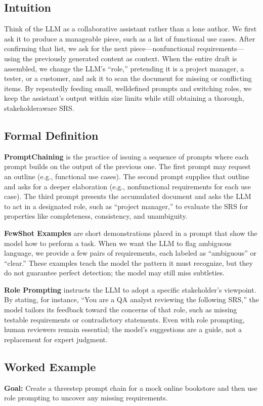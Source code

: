 \documentclass[12pt, a4paper]{article}
\begin{document}
\subsection{Intuition}
Think of the LLM as a collaborative assistant rather than a lone author.  
We first ask it to produce a manageable piece, such as a list of functional use cases.  
After confirming that list, we ask for the next piece---nonfunctional requirements---using the previously generated content as context.  
When the entire draft is assembled, we change the LLM's ``role,'' pretending it is a project manager, a tester, or a customer, and ask it to scan the document for missing or conflicting items.  
By repeatedly feeding small, welldefined prompts and switching roles, we keep the assistant's output within size limits while still obtaining a thorough, stakeholderaware SRS.

\subsection{Formal Definition}
\textbf{PromptChaining} is the practice of issuing a sequence of prompts where each prompt builds on the output of the previous one.  
The first prompt may request an outline (e.g., functional use cases).  
The second prompt supplies that outline and asks for a deeper elaboration (e.g., nonfunctional requirements for each use case).  
The third prompt presents the accumulated document and asks the LLM to act in a designated role, such as ``project manager,'' to evaluate the SRS for properties like completeness, consistency, and unambiguity.

\textbf{FewShot Examples} are short demonstrations placed in a prompt that show the model how to perform a task.  
When we want the LLM to flag ambiguous language, we provide a few pairs of requirements, each labeled as ``ambiguous'' or ``clear.''  
These examples teach the model the pattern it must recognize, but they do not guarantee perfect detection; the model may still miss subtleties.

\textbf{Role Prompting} instructs the LLM to adopt a specific stakeholder's viewpoint.  
By stating, for instance, ``You are a QA analyst reviewing the following SRS,'' the model tailors its feedback toward the concerns of that role, such as missing testable requirements or contradictory statements.  
Even with role prompting, human reviewers remain essential; the model's suggestions are a guide, not a replacement for expert judgment.

\subsection{Worked Example}
\textbf{Goal:} Create a threestep prompt chain for a mock online bookstore and then use role prompting to uncover any missing requirements.
\end{document}
